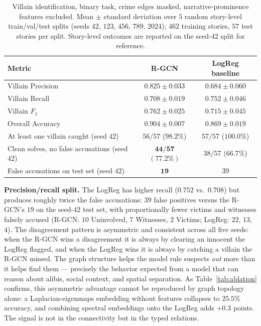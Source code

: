 \documentclass[11pt]{article}
\begin{document}
\begin{table}[h]
\centering
\small
\caption{Villain identification, binary task, crime edges masked, narrative-prominence features excluded. Mean $\pm$ standard deviation over $5$ random story-level train/val/test splits (seeds $42$, $123$, $456$, $789$, $2024$); $462$ training stories, $57$ test stories per split. Story-level outcomes are reported on the seed-$42$ split for reference.}
\label{tab:headline}
\begin{tabular}{lcc}
\toprule
\textbf{Metric} & \textbf{R-GCN} & \textbf{LogReg baseline} \\
\midrule
Villain Precision & $\mathbf{0.825 \pm 0.033}$ & $0.684 \pm 0.060$ \\
Villain Recall & $0.708 \pm 0.019$ & $\mathbf{0.752 \pm 0.046}$ \\
Villain $F_1$ & $\mathbf{0.762 \pm 0.025}$ & $0.715 \pm 0.045$ \\
Overall Accuracy & $\mathbf{0.904 \pm 0.007}$ & $0.869 \pm 0.019$ \\
\midrule
At least one villain caught (seed $42$) & $56/57$ ($98.2\%$) & $57/57$ ($100.0\%$) \\
Clean solves, no false accusations (seed $42$) & $\mathbf{44/57}$ $(\mathbf{77.2\%})$ & $38/57$ ($66.7\%$) \\
False accusations on test set (seed $42$) & $\mathbf{19}$ & $39$ \\
\bottomrule
\end{tabular}
\end{table}

\textbf{Precision/recall split.} The LogReg has higher recall ($0.752$ vs.~$0.708$) but produces roughly twice the false accusations: $39$ false positives versus the R-GCN's $19$ on the seed-$42$ test set, with proportionally fewer victims and witnesses falsely accused (R-GCN: $10$ Uninvolved, $7$ Witnesses, $2$ Victims; LogReg: $22$, $13$, $4$). The disagreement pattern is asymmetric and consistent across all five seeds: when the R-GCN wins a disagreement it is always by clearing an innocent the LogReg flagged, and when the LogReg wins it is always by catching a villain the R-GCN missed. The graph structure helps the model rule suspects \emph{out} more than it helps find them --- precisely the behavior expected from a model that can reason about alibis, social context, and spatial separation. As Table~\ref{tab:ablation} confirms, this asymmetric advantage cannot be reproduced by graph topology alone: a Laplacian-eigenmaps embedding without features collapses to $25.5\%$ accuracy, and combining spectral embeddings onto the LogReg adds $+0.3$ points. The signal is not in the connectivity but in the typed relations.
\end{document}
